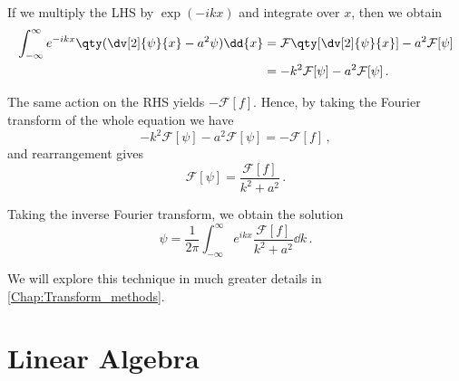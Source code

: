 \documentclass{article}
\theoremstyle{plain}\theoremheaderfont{\normalfont\itshape}\theorembodyfont{\rmfamily}\theoremseparator{.}\newtheorem*{rem}{Remark}\newtheorem*{ex}{Example}\newtheorem*{proof}{Proof}\newtheorem*{altp}{Alternative proof}
\theoremstyle{plain}\theoremheaderfont{\normalfont\bfseries}\theorembodyfont{\rmfamily}\theoremseparator{.}\newtheorem{thm}{Theorem}[section]\newtheorem{lem}[thm]{Lemma}\newtheorem{prop}[thm]{Proposition}\newtheorem*{cor}{Corollary}\newtheorem{defn}[thm]{Definition}\newtheorem{clm}[thm]{Claim}\newtheorem{clminproof}{Claim}
\theoremstyle{break}\theoremheaderfont{\normalfont\itshape}\theorembodyfont{\rmfamily}\theoremseparator{.\medskip}\newtheorem*{proofskip}{Proof}\newtheorem*{exs}{Examples}\newtheorem*{rems}{Remarks}
\theoremstyle{break}\theoremheaderfont{\normalfont\bfseries}\theorembodyfont{\rmfamily}\theoremseparator{.\medskip}\newtheorem{lemskip}[thm]{Lemma}\newtheorem{defnskip}[thm]{Definition}\newtheorem{propskip}[thm]{Proposition}\newtheorem{thmskip}[thm]{Theorem}
\numberwithin{equation}{section}
\begin{document}
	If we multiply the LHS by \(\exp(-ikx)\) and integrate over \(x\), then we obtain
	\begin{align*}
		\int_{-\infty}^{\infty}e^{-ikx}\qty(\dv[2]{\psi}{x}-a^2\psi)\dd{x}&=\mathcal{F}\qty[\dv[2]{\psi}{x}]-a^2\mathcal{F}[\psi]\\
		&=-k^2\mathcal{F}[\psi]-a^2\mathcal{F}[\psi]\,.
	\end{align*}
	
	The same action on the RHS yields \(-\mathcal{F}[f]\). Hence, by taking the Fourier transform of the whole equation we have
	\[-k^2\mathcal{F}[\psi]-a^2\mathcal{F}[\psi]=-\mathcal{F}[f]\,,\]
	and rearrangement gives
	\[\mathcal{F}[\psi]=\frac{\mathcal{F}[f]}{k^2+a^2}\,.\]
	
	Taking the inverse Fourier transform, we obtain the solution
	\[\psi=\frac{1}{2\pi}\int_{-\infty}^{\infty}e^{ikx}\frac{\mathcal{F}[f]}{k^2+a^2}\dd{k}\,.\]

	We will explore this technique in much greater details in \cref{Chap:Transform_methods}.
	
	\newpage
	
	\section{Linear Algebra}
\end{document}

